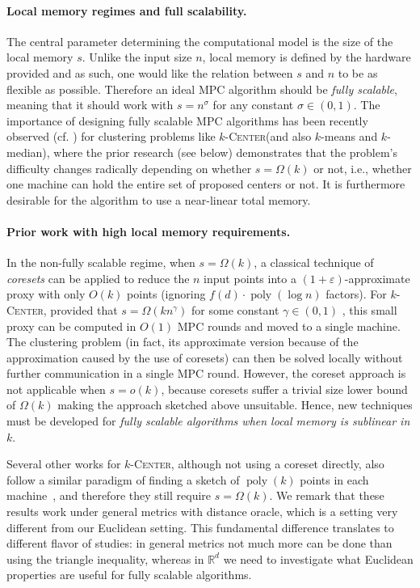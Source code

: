 \documentclass[11pt,letterpaper]{article}
\theoremstyle{plain}
\theoremstyle{definition}
\theoremstyle{remark}
\newcommand{\ProblemName}[1]{\textsc{#1}}
\newcommand{\kCenter}{$k$-\ProblemName{Center}\xspace}
\DeclareMathOperator{\poly}{poly}
\renewcommand{\epsilon}{\ensuremath{\varepsilon}}
\let\epsilon\varepsilon
\begin{document}
\paragraph{Local memory regimes and full scalability.}
The central parameter determining the computational model is the size of the local memory $s$. Unlike the input size $n$, local memory is defined by the hardware provided and as such, one would like the relation between $s$ and $n$ to be as flexible as possible. Therefore an ideal MPC algorithm should be \emph{fully scalable}, meaning that it should work with $s = n^{\sigma}$ for any constant $\sigma \in (0,1)$. The importance of designing fully scalable MPC algorithms has been recently observed (cf. \cite{BhaskaraW18}) for clustering problems like \kCenter (and also $k$-means and $k$-median), where the prior research (see below) demonstrates that the problem's difficulty changes radically depending on whether $s = \Omega(k)$ or not, i.e., whether one machine can hold the entire set of proposed centers or not.
It is furthermore desirable for the algorithm to use a near-linear total memory.




\paragraph{Prior work with high local memory requirements.}
In the non-fully scalable regime, when $s = \Omega(k)$, a classical technique of \textit{coresets} \cite{Har-Peled04,Har-PeledM04} can be applied
to reduce the $n$ input points into a $(1 + \epsilon)$-approximate proxy with only $O(k)$ points (ignoring $f(d) \cdot \poly(\log n)$ factors).
For \kCenter, provided that $s = \Omega(k n^\gamma)$ for some constant $\gamma \in (0, 1)$ \cite{BBM23},
this small proxy can be computed in $O(1)$ MPC rounds
and moved to a single machine. The clustering problem (in fact, its approximate version because of the approximation caused by the use of coresets) can then be solved locally without further communication in a single MPC round.
However, the coreset approach is not applicable when $s = o(k)$, because coresets suffer a trivial size lower bound of $\Omega(k)$ making the approach sketched above unsuitable.
Hence, new techniques must be developed for \emph{fully scalable algorithms when local memory is sublinear in $k$}.


Several other works for \kCenter, although not using a coreset directly, also follow a similar paradigm of finding a sketch of $\poly(k)$ points in each machine~\cite{EneIM11,MalkomesKCWM15,HZ23,AG23}, and therefore they still require $s = \Omega(k)$.
We remark that these results work under general metrics with distance oracle,
which is a setting very different from our Euclidean setting.
This fundamental difference translates to different flavor of studies: in general metrics not much more can be done than using the triangle inequality, whereas in $\mathbb{R}^d$ we need to investigate what Euclidean properties are useful for fully scalable algorithms.
\end{document}
